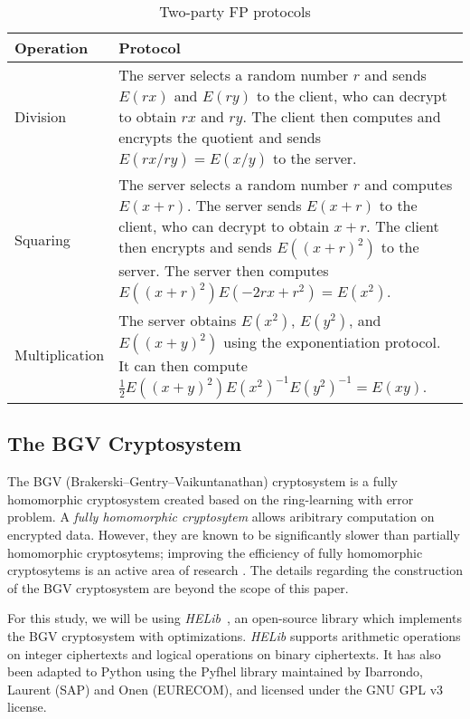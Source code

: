 \begin{table}[ht]
	\caption{Two-party FP protocols}
	\label{tab:flop_summary}
    \begin{tabular}{
        p{}
        p{}}
		\toprule
		Operation & Protocol\\
        \midrule
            Division &
            The server selects a random number $r$ and sends $E(rx)$ and $E(ry)$ to the client, who can decrypt to obtain $rx$ and $ry$. The client then computes and encrypts the quotient and sends $E(rx/ry) = E(x/y)$ to the server. 
            \\
            Squaring &
            The server selects a random number $r$ and computes $E\left(x+r\right)$. The server sends $E(x+r)$  to the client, who can decrypt to obtain $x+r$. The client then encrypts and sends $E((x+r)^2)$ to the server. The server then computes $E\left(\left(x+r\right)^2\right)E\left(-2rx + r^2\right) = E\left(x^2\right)$.
            \\
            Multiplication &
            The server obtains $E(x^2)$, $E(y^2)$, and $E((x+y)^2)$ using the exponentiation protocol. It can then compute $\frac{1}{2}E\left(\left(x+y\right)^2\right)E\left(x^2\right)^{-1}E\left(y^2\right)^{-1} = E\left(xy\right)$.\\
	    \bottomrule
    \end{tabular}
\end{table}
\subsection{The BGV Cryptosystem}
The BGV (Brakerski--Gentry--Vaikuntanathan) cryptosystem \cite{cryptoeprint:2011:277} is a fully homomorphic cryptosystem created based on the ring-learning with error problem. A \textit{fully homomorphic cryptosytem} allows aribitrary computation on encrypted data.
However, they are known to be significantly slower than partially homomorphic cryptosytems; improving the efficiency of fully homomorphic cryptosytems is an active area of research \cite{sen_homomorphic_2013}. 
The details regarding the construction of the BGV cryptosystem are beyond the scope of this paper. 

For this study, we will be using \textit{HELib}~\cite{garay_algorithms_2014}, an open-source library which implements the BGV cryptosystem with optimizations. \textit{HELib} supports arithmetic operations on integer ciphertexts and logical operations on binary ciphertexts. 
It has also been adapted to Python using the Pyfhel library \cite{pyfhel_2018} maintained by Ibarrondo, Laurent (SAP) and Onen (EURECOM), and licensed under the GNU GPL v3 license.  
